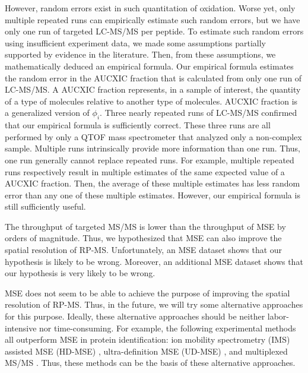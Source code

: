 However, random errors exist in such quantitation of oxidation. 
Worse yet, only multiple repeated runs can empirically estimate such random errors, but we have only one run of targeted \gls{LC-MS/MS} per peptide.
To estimate such random errors using insufficient experiment data, we made some assumptions partially supported by evidence in the literature.
Then, from these assumptions, we mathematically deduced an empirical formula.
Our empirical formula estimates the random error in the \gls{AUCXIC} fraction that is calculated from only one run of \gls{LC-MS/MS}.
A \gls{AUCXIC} fraction represents, in a sample of interest, the quantity of a type of molecules relative to another type of molecules.
\gls{AUCXIC} fraction is a generalized version of \(\phi_i\).
Three nearly repeated runs of \gls{LC-MS/MS} confirmed that our empirical formula is sufficiently correct.
These three runs are all performed by only a \gls{QTOF} mass spectrometer that analyzed only a non-complex sample.
Multiple runs intrinsically provide more information than one run.
Thus, one run generally cannot replace repeated runs.
For example, multiple repeated runs respectively result in multiple estimates of the same expected value of a \gls{AUCXIC} fraction.
Then, the average of these multiple estimates has less random error than any one of these multiple estimates.
However, our empirical formula is still sufficiently useful.

The throughput of targeted \gls{MS/MS} is lower than the throughput of \gls{MSE} by orders of magnitude.
Thus, we hypothesized that \gls{MSE} can also improve the spatial resolution of \gls{RP-MS}.
Unfortunately, an \gls{MSE} dataset shows that our hypothesis is likely to be wrong.
Moreover, an additional \gls{MSE} dataset shows that our hypothesis is very likely to be wrong.
		
\Gls{MSE} does not seem to be able to achieve the purpose of improving the spatial resolution of \gls{RP-MS}.	
Thus, in the future, we will try some alternative approaches for this purpose.
Ideally, these alternative approaches should be neither labor-intensive nor time-consuming.
For example, the following experimental methods all outperform \gls{MSE} in protein identification:
	ion mobility spectrometry (IMS) assisted \gls{MSE} (HD-\gls{MSE}) \cite{distler2013drift},
	ultra-definition \gls{MSE} (UD-\gls{MSE}) \cite{distler2013drift},
	and multiplexed \gls{MS/MS} \cite{egertson2013multiplexed}.
Thus, these methods can be the basis of these alternative approaches.

